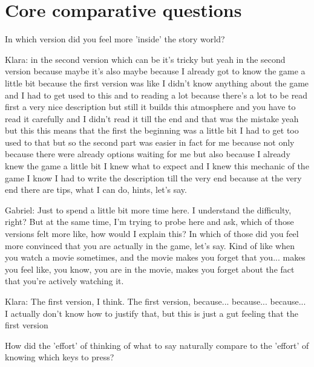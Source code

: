 \section{Core comparative questions}

\begin{QandA}
   \item In which version did you feel more 'inside' the story world?
         \begin{answered}
            Klara: in the second version which can be it's tricky but yeah in the second version because maybe it's also maybe because I already got to know the game a little bit because the first version was like I didn't know anything about the game and I had to get used to this and to reading a lot because there's a lot to be read first a very nice description but still it builds this atmosphere and you have to read it carefully and I didn't read it till the end and that was the mistake
            yeah but this this means that the first the beginning was a little bit I had to get too used to that but so the second part was easier in fact for me because not only because there were already options waiting for me but also because I already knew the game a little bit I knew what to expect and I knew this mechanic of the game I know I had to write the description till the very end because at the very end there are
            tips, what I can do, hints, let's say.


            Gabriel: Just to spend a little bit more time here.
            I understand the difficulty, right?
            But at the same time, I'm trying to probe here and ask, which of those versions felt more like, how would I explain this?
            In which of those did you feel more convinced that you are actually
            in the game, let's say. Kind of like when you watch a movie sometimes, and the movie makes you forget that you... makes you feel like, you know, you are in the movie, makes you forget about the fact that you're actively watching it.


            Klara: The first version, I think.
            The first version, because... because... because...
            I actually don't know how to justify that, but this is just a gut feeling that the first version
            

           
         \end{answered}

   \item How did the 'effort' of thinking of what to say naturally compare to the 'effort' of knowing which keys to press?


\end{QandA}
